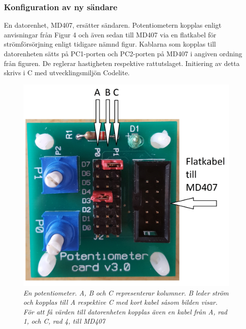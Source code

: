 \documentclass[a4paper]{article}
\begin{document}
\subsubsection{Konfiguration av ny sändare}
En datorenhet, MD407, ersätter sändaren. Potentiometern kopplas enligt anvisningar från Figur 4 och även sedan till MD407 via en flatkabel för strömförsörjning enligt tidigare nämnd figur. Kablarna som kopplas till datorenheten sätts på PC1-porten och PC2-porten på MD407 i angiven ordning från figuren. De reglerar hastigheten respektive rattutslaget. Initiering av detta skrivs i C med utvecklingsmiljön Codelite.


\begin{figure}[H]
\includegraphics[scale=0.05]{PotentiometerMedRitning.jpg}
\centering
\caption{\it En potentiometer. A, B och C representerar kolumner. B leder ström och kopplas till A respektive C med kort kabel såsom bilden visar. För att få värden till datorenheten kopplas även en kabel från A, rad 1, och C, rad 4, till MD407}
\end{figure} 
\end{document}
